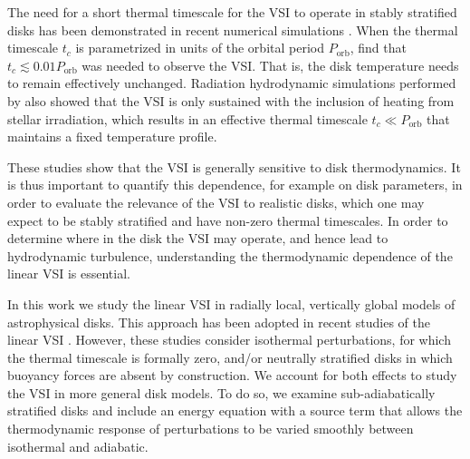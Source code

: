 \documentclass[iop]{emulateapj}
\begin{document}
The need for a short thermal timescale for the VSI to operate in
stably stratified disks has been demonstrated in recent numerical simulations 
\citep{nelson13,stoll14}. When the  thermal timescale $t_c$ is
parametrized in units of the orbital period  $P_\mathrm{orb}$,
\cite{nelson13} find that $t_c\lesssim  0.01P_\mathrm{orb}$ was needed
to observe the VSI. That is, the  disk temperature needs to remain
effectively unchanged. Radiation hydrodynamic simulations performed by
\cite{stoll14} also showed that the VSI is only sustained with the
inclusion of heating from stellar irradiation, which results in an
effective thermal timescale $t_c\ll P_\mathrm{orb}$ that maintains a
fixed temperature profile.     

These studies show that the VSI is generally sensitive to disk
thermodynamics. It is thus important to quantify this dependence, for
example on disk parameters, in order to evaluate the relevance of the
VSI to realistic disks, which one may expect to be stably
stratified and have non-zero thermal timescales.  In order to determine
where in the disk the VSI may operate, and hence lead to hydrodynamic
turbulence, understanding the thermodynamic dependence of the linear VSI is essential. 


In this work we study the linear VSI in radially local, vertically
global models of astrophysical disks. This approach has
been adopted in recent studies of the linear VSI
\citep{nelson13,mcnally14,barker15}. However, these studies consider 
isothermal perturbations, for which the thermal timescale is formally
zero, and/or neutrally stratified disks in which buoyancy forces are
absent by construction. We account for both effects to study the
VSI in more general disk models. To do so, we examine 
sub-adiabatically stratified disks and include an energy equation 
with a source term that allows the thermodynamic response of 
perturbations to be varied smoothly between isothermal and 
adiabatic.   





\end{document}
